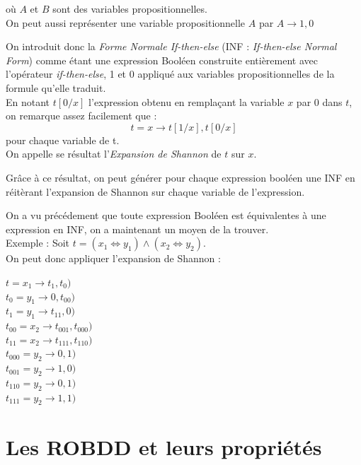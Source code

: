 \documentclass[a4paper, oneside]{report}
\begin{document}
où $A$ et $B$ sont des variables propositionnelles.\\

On peut aussi représenter une variable propositionnelle $A$ par $A \rightarrow 1, 0$

On introduit donc la \textit{Forme Normale If-then-else} (INF : \textit{If-then-else Normal Form}) comme étant une expression Booléen construite entièrement avec l'opérateur \textit{if-then-else}, 1 et 0 appliqué aux variables propositionnelles de la formule qu'elle traduit.\\

En notant $t[0/x]$ l'expression obtenu en remplaçant la variable $x$ par $0$ dans $t$, on remarque assez facilement que :
$$ t = x \rightarrow t[1/x], t[0/x] $$ pour chaque variable de t.\\
On appelle se résultat l'\textit{Expansion de Shannon} de $t$ sur $x$.

Grâce à ce résultat, on peut générer pour chaque expression booléen une INF en réitèrant l'expansion de Shannon sur chaque variable de l'expression.

On a vu précédement que toute expression Booléen est équivalentes à une expression en INF, on a maintenant un moyen de la trouver.\\

Exemple : Soit $t = ( x_1 \Leftrightarrow y_1 ) \wedge ( x_2 \Leftrightarrow y_2 )$.\\
On peut donc appliquer l'expansion de Shannon :
\begin{center}
$t = x_1 \rightarrow t_1, t_0)$\\
$t_0 = y_1 \rightarrow 0, t_{00})$\\
$t_1 = y_1 \rightarrow t_{11}, 0)$\\
$t_{00} = x_2 \rightarrow t_{001}, t_{000})$\\
$t_{11} = x_2 \rightarrow t_{111}, t_{110})$\\
$t_{000} = y_2 \rightarrow 0, 1)$\\
$t_{001} = y_2 \rightarrow 1, 0)$\\
$t_{110} = y_2 \rightarrow 0, 1)$\\
$t_{111} = y_2 \rightarrow 1, 1)$\\
\end{center}

\section{Les ROBDD et leurs propriétés}
\end{document}
